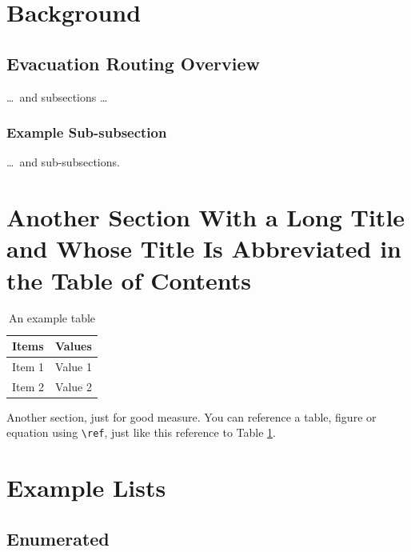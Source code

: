\documentclass[12pt,a4paper]{report}
\begin{document}
\section{Background}

\subsection{Evacuation Routing Overview}
\dots\ and subsections \dots

\subsubsection{Example Sub-subsection}
\dots\ and sub-subsections.

\section[Short Section Title]{Another Section With a Long Title and Whose Title Is Abbreviated in the Table of Contents}

\begin{table}[htb]
\caption{An example table}
\bigskip
\begin{center}
\label{Example-Table}
\begin{tabular}{|l|l|}
\hline
Items & Values \\
\hline
\hline
Item 1 & Value 1 \\
Item 2 & Value 2 \\
\hline
\end{tabular}
\end{center}
\end{table}

Another section, just for good measure. You can reference a table, figure or equation using \verb|\ref|, just like this reference to Table \ref{Example-Table}.

\section{Example Lists}

\subsection{Enumerated}
\end{document}
